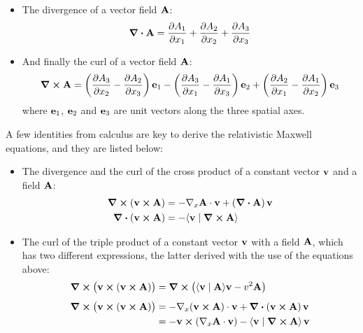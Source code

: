 \documentclass[12pt]{article}
\newcommand{\ip}[2]{\langle #1 \mid #2 \rangle}
\begin{document}
\begin{itemize}
  \item The divergence of a vector field $\vb{A}$:
  \begin{equation}
    \div \vb{A} = \pdv{A_1}{x_1} + \pdv{A_2}{x_2} + \pdv{A_3}{x_3}
  \end{equation}

  \item And finally the curl of a vector field $\vb{A}$:
  \begin{equation}
    \curl \vb{A} =
      \left(\pdv{A_3}{x_2} - \pdv{A_2}{x_3}\right)\vb{e}_1
      - \left(\pdv{A_3}{x_1} - \pdv{A_1}{x_3}\right)\vb{e}_2
      + \left(\pdv{A_2}{x_1} - \pdv{A_1}{x_2}\right)\vb{e}_3
  \end{equation}
  where $\vb{e}_1$, $\vb{e}_2$ and $\vb{e}_3$ are unit vectors along the three spatial axes.
\end{itemize}

A few identities from calculus are key to derive the relativistic Maxwell equations, and they
are listed below:

\begin{itemize}
  \item The divergence and the curl of the cross product of a constant vector $\vb{v}$ and a
        field $\vb{A}$:
  \begin{equation}
    \begin{aligned}
      \curl(\vb{v} \cross \vb{A}) &= -\nabla_x \vb{A} \cdot \vb{v} + (\div \vb{A})\,\vb{v} \\
      \div(\vb{v} \cross \vb{A})  &= -\ip{\vb{v}}{\curl \vb{A}}
    \end{aligned}
    \label{eq:divergence_curl_cross_product}
  \end{equation}

  \item The curl of the triple product of a constant vector $\vb{v}$ with a field $\vb{A}$,
        which has two different expressions, the latter derived with the use of the equations
        above:
  \begin{equation}
    \begin{aligned}
      \curl\bigl(\vb{v} \cross (\vb{v} \cross \vb{A})\bigr)
        &= \curl\bigl(\ip{\vb{v}}{\vb{A}}\vb{v} - v^2\vb{A}\bigr) \\[4pt]
      \curl\bigl(\vb{v} \cross (\vb{v} \cross \vb{A})\bigr)
        &= -\nabla_x(\vb{v} \cross \vb{A}) \cdot \vb{v}
           + \div(\vb{v} \cross \vb{A})\,\vb{v} \\
        &= -\vb{v} \cross (\nabla_x \vb{A} \cdot \vb{v})
           - \ip{\vb{v}}{\curl \vb{A}}\,\vb{v}
    \end{aligned}
    \label{eq:curl_triple_product}
  \end{equation}
\end{itemize}
\end{document}
